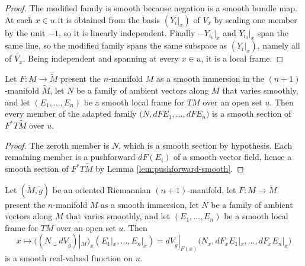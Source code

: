 \begin{proof}
\leanok
The modified family is smooth because negation is a smooth bundle map. At each $x \in u$ it is
obtained from the basis $(Y_i|_x)$ of $V_x$ by scaling one member by the unit $-1$, so it is
linearly independent. Finally $-Y_{i_0}|_x$ and $Y_{i_0}|_x$ span the same line, so the modified
family spans the same subspace as $(Y_i|_x)$, namely all of $V_x$. Being independent and
spanning at every $x \in u$, it is a local frame.
\end{proof}

\begin{lemma}
\label{lem:adapted-frame-smooth}
\leanok
{}
Let $F : M \to \tilde M$ present the $n$-manifold $M$ as a smooth immersion in the
$(n+1)$-manifold $\tilde M$, let $N$ be a family of ambient vectors along $M$ that varies
smoothly, and let $(E_1, \ldots, E_n)$ be a smooth local frame for $TM$ over an open set $u$.
Then every member of the adapted family $\bigl(N, dF E_1, \ldots, dF E_n\bigr)$ is a smooth
section of $F^* T\tilde M$ over $u$.
\end{lemma}

\begin{proof}
\leanok
{}
The zeroth member is $N$, which is a smooth section by hypothesis. Each remaining member is a
pushforward $dF(E_i)$ of a smooth vector field, hence a smooth section of $F^* T\tilde M$ by
Lemma \ref{lem:pushforward-smooth}.
\end{proof}

\begin{lemma}
\label{lem:normal-restrict-frame-smooth}
\leanok
{}
Let $(\tilde M, \tilde g)$ be an oriented Riemannian $(n+1)$-manifold, let $F : M \to \tilde M$
present the $n$-manifold $M$ as a smooth immersion, let $N$ be a family of ambient vectors along
$M$ that varies smoothly, and let $(E_1, \ldots, E_n)$ be a smooth local frame for $TM$ over an
open set $u$. Then
\[
  x \longmapsto \bigl((N \lrcorner dV_{\tilde g})|_M\bigr)_x(E_1|_x, \ldots, E_n|_x)
    = dV_{\tilde g}|_{F(x)}\bigl(N_x, dF_x E_1|_x, \ldots, dF_x E_n|_x\bigr)
\]
is a smooth real-valued function on $u$.
\end{lemma}

